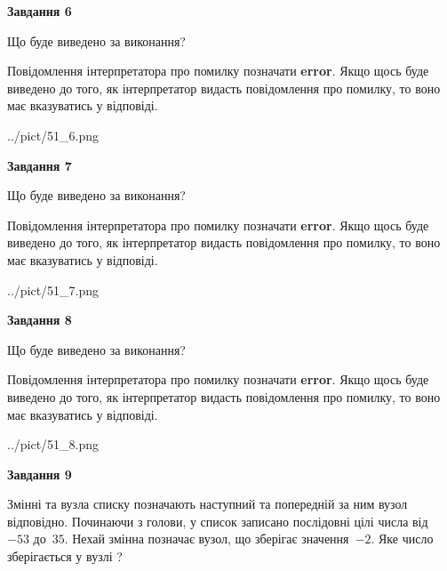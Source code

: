 \documentclass[12pt, ukrainian]{article}
\begin{document}
{\begin {large}
{\begin {center}\textbf{Завдання 6}\end {center}}\par
Що буде виведено за виконання?

Повідомлення інтерпретатора про помилку позначати \textbf{error}.
Якщо щось буде виведено до того, як інтерпретатор видасть повідомлення про помилку, 
то воно має вказуватись у відповіді. \par


\begin{center}
	{../pict/51_6.png}
\end{center}
\newpage

{\begin {center}\textbf{Завдання 7}\end {center}}\par
Що буде виведено за виконання?

Повідомлення інтерпретатора про помилку позначати \textbf{error}.
Якщо щось буде виведено до того, як інтерпретатор видасть повідомлення про помилку, 
то воно має вказуватись у відповіді. \par


\begin{center}
	{../pict/51_7.png}
\end{center}
\newpage

{\begin {center}\textbf{Завдання 8}\end {center}}\par
Що буде виведено за виконання?

Повідомлення інтерпретатора про помилку позначати \textbf{error}.
Якщо щось буде виведено до того, як інтерпретатор видасть повідомлення про помилку, 
то воно має вказуватись у відповіді. \par


\begin{center}
	{../pict/51_8.png}
\end{center}
\newpage

{\begin {center}\textbf{Завдання 9}\end {center}}\par
Змінні  та  вузла списку позначають наступний та попередній за ним вузол відповідно. Починаючи з голови, у список записано послідовні цілі числа від~$-53$ до~$35$. Нехай змінна  позначає вузол, що зберігає значення~$-2$.
Яке число зберігається у вузлі  ?\par
\newpage


\end{large}}
\end{document}
